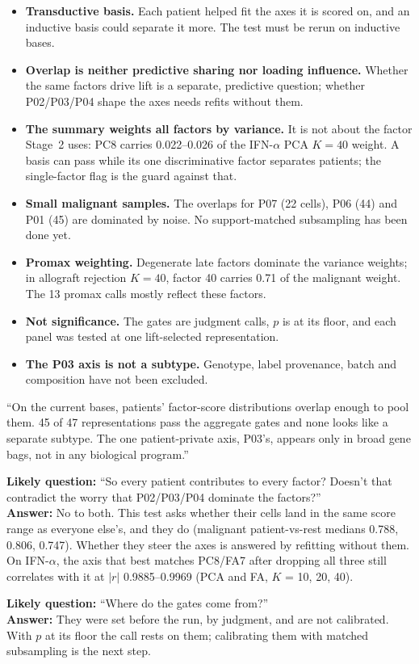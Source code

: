 \begin{caveatbox}
\begin{itemize}
\item \textbf{Transductive basis.} Each patient helped fit the axes it is scored on, and an inductive basis could separate it more. The test must be rerun on inductive bases.
\item \textbf{Overlap is neither predictive sharing nor loading influence.} Whether the same factors drive lift is a separate, predictive question; whether P02/P03/P04 shape the axes needs refits without them. 
\item \textbf{The summary weights all factors by variance.} It is not about the factor Stage~2 uses: PC8 carries 0.022--0.026 of the IFN-$\alpha$ PCA $K = 40$ weight. A basis can pass while its one discriminative factor separates patients; the single-factor flag is the guard against that.
\item \textbf{Small malignant samples.} The overlaps for P07 (22 cells), P06 (44) and P01 (45) are dominated by noise. No support-matched subsampling has been done yet.
\item \textbf{Promax weighting.} Degenerate late factors dominate the variance weights; in allograft rejection $K = 40$, factor 40 carries 0.71 of the malignant weight. The 13 promax calls mostly reflect these factors.
\item \textbf{Not significance.} The gates are judgment calls, $p$ is at its floor, and each panel was tested at one lift-selected representation.
\item \textbf{The P03 axis is not a subtype.} Genotype, label provenance, batch and composition have not been excluded.
\end{itemize}
\end{caveatbox}

\begin{teambox}
``On the current bases, patients' factor-score distributions overlap enough to pool them. 45 of 47 representations pass the aggregate gates and none looks like a separate subtype. The one patient-private axis, P03's, appears only in broad gene bags, not in any biological program.''

\textbf{Likely question:} ``So every patient contributes to every factor? Doesn't that contradict the worry that P02/P03/P04 dominate the factors?''\\
\textbf{Answer:} No to both. This test asks whether their cells land in the same score range as everyone else's, and they do (malignant patient-vs-rest medians 0.788, 0.806, 0.747). Whether they steer the axes is answered by refitting without them. On IFN-$\alpha$, the axis that best matches PC8/FA7 after dropping all three still correlates with it at $|r|$ 0.9885--0.9969 (PCA and FA, $K$ = 10, 20, 40). 

\textbf{Likely question:} ``Where do the gates come from?''\\
\textbf{Answer:} They were set before the run, by judgment, and are not calibrated. With $p$ at its floor the call rests on them; calibrating them with matched subsampling is the next step.
\end{teambox}

